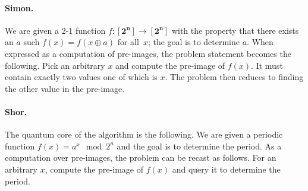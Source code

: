 \documentclass{article}
\newcommand{\finset}[1]{[\mathbf{#1}]}
\begin{document}
\paragraph*{Simon.}
We are given a 2-1 function $f : \finset{2^n} \rightarrow
\finset{2^n}$ with the property that there exists an $a$ such $f(x) =
f(x \oplus a)$ for all~$x$; the goal is to determine $a$. When
expressed as a computation of pre-images, the problem statement
becomes the following. Pick an arbitrary $x$ and compute the pre-image
of $f(x)$. It must contain exactly two values one of which is $x$. The
problem then reduces to finding the other value in the pre-image.

\paragraph*{Shor.}
The quantum core of the algorithm is the following. We are given a
periodic function $f(x) = a^x \mod{2^n}$ and the goal is to determine
the period. As a computation over pre-images, the problem can be
recast as follows. For an arbitrary $x$, compute the pre-image of
$f(x)$ and query it to determine the period.


\printbibliography
\end{document}
